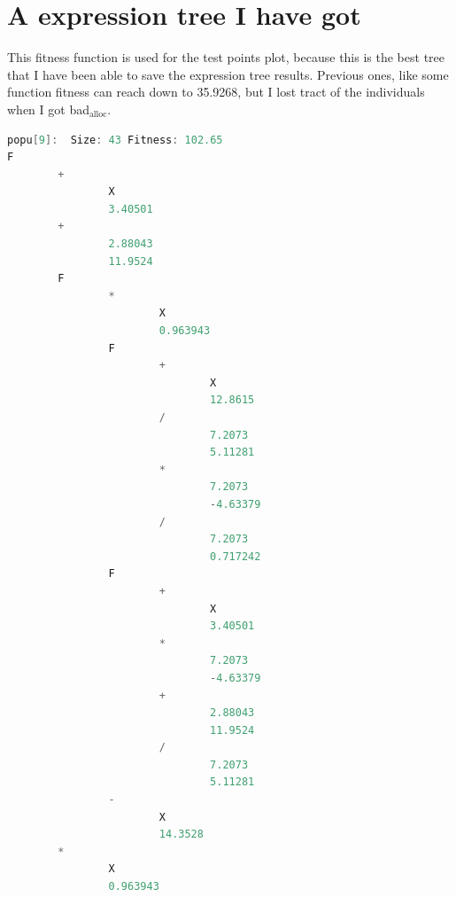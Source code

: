 \documentclass[10pt,b5paper]{article}
\begin{document}
\section{A expression tree I have got}
\label{sec-5}
This fitness function is used for the test points plot, because this is the best tree that I have been able to save the expression tree results. Previous ones, like some function fitness can reach down to 35.9268, but I lost tract of the individuals when I got bad$_{\text{alloc}}$. 
\begin{lstlisting}[language=c++]
popu[9]:  Size: 43 Fitness: 102.65
F  
        +  
                X  
                3.40501  
        +  
                2.88043  
                11.9524  
        F  
                *  
                        X  
                        0.963943  
                F  
                        +  
                                X  
                                12.8615  
                        /  
                                7.2073  
                                5.11281  
                        *  
                                7.2073  
                                -4.63379  
                        /  
                                7.2073  
                                0.717242  
                F  
                        +  
                                X  
                                3.40501  
                        *  
                                7.2073  
                                -4.63379  
                        +  
                                2.88043  
                                11.9524  
                        /  
                                7.2073  
                                5.11281  
                -  
                        X  
                        14.3528  
        *  
                X  
                0.963943  
\end{lstlisting}
\end{document}
